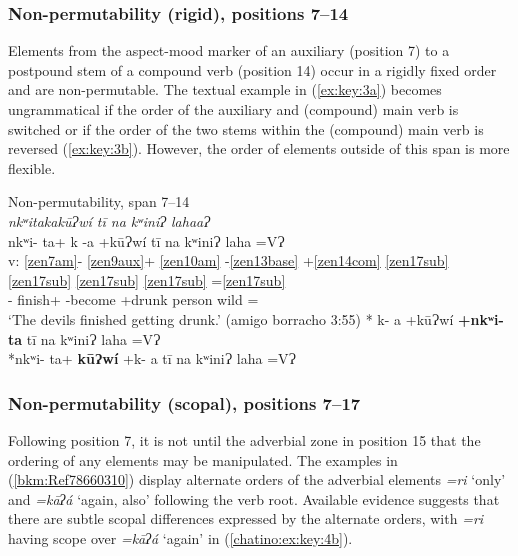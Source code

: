 \documentclass[output=paper]{langscibook}
\begin{document}
\subsubsection{Non-permutability (rigid), positions 7{}--14}
\label{bkm:Ref78989028}
Elements from the aspect-mood marker of an auxiliary (position 7) to a postpound stem of a compound verb (position 14) occur in a rigidly fixed order and are non-permutable. The textual example in (\ref{ex:key:3a}) becomes ungrammatical if the order of the auxiliary and (compound) main verb is switched or if the order of the two stems within the (compound) main verb is reversed (\ref{ex:key:3b}). However, the order of elements outside of this span is more flexible.


\ea\label{bkm:Ref78658419}Non-permutability, span 7{}--14 \\ 
        \ea\label{ex:key:3a}{
        \textit{nkʷitakakūɁwí tī na kʷiniɁ lahaaɁ} \\ 
        \glll {} nkʷi- ta+ k -a +kūɁwí tī na kʷiniɁ laha =VɁ\\
        v: \ref{zen7am}- \ref{zen9aux}+ \ref{zen10am} -\ref{zen13base} +\ref{zen14com} \ref{zen17sub} \ref{zen17sub} \ref{zen17sub} \ref{zen17sub} =\ref{zen17sub} \\ 
        {} \Pfv{}- finish+ \Pot{} -become +drunk \Tplz{} \Def{} person wild =\Ana{}\\
        \glt `The devils finished getting drunk.' (amigo borracho 3:55)
        } 
        \ex\label{ex:key:3b} *{ k- a +kūɁwí \textbf{+nkʷi-} \textbf{ta} tī na kʷiniɁ laha =VɁ \\ 
        *nkʷi- ta+ \textbf{kūɁwí} +k- a tī na kʷiniɁ laha =VɁ \\
        } 
        \z 
\z 


\subsubsection{Non-permutability (scopal), positions 7{}--17}
\label{bkm:Ref78989083}\label{bkm:Ref113307808}
Following position 7, it is not until the adverbial zone in position 15 that the ordering of any elements may be manipulated. The examples in (\ref{bkm:Ref78660310}) display alternate orders of the adverbial elements \textit{=ri} `only' and \textit{=kāʔá} `again, also' following the verb root. Available evidence suggests that there are subtle scopal differences expressed by the alternate orders, with \textit{=ri} having scope over \textit{=kāʔá} `again' in (\ref{chatino:ex:key:4b}).
\end{document}
